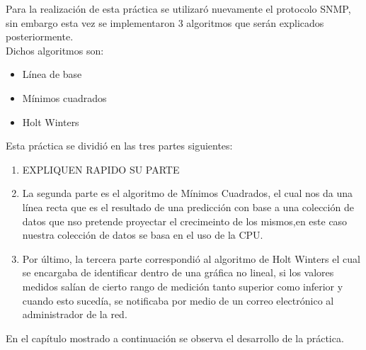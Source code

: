 Para la realización de esta práctica se utilizaró nuevamente el protocolo SNMP, sin embargo esta vez se implementaron 3 algoritmos que serán explicados posteriormente.\\
Dichos algoritmos son:
\begin{itemize}
\item Línea de base
\item Mínimos cuadrados
\item Holt Winters
\end{itemize} 

Esta práctica se dividió en las tres partes siguientes:
\begin{enumerate}
\item EXPLIQUEN RAPIDO SU PARTE
\item La segunda parte es el algoritmo de Mínimos Cuadrados, el cual nos da una línea recta que es el resultado de una predicción con base a una colección de datos que nso pretende proyectar el crecimeinto de los mismos,en este caso nuestra colección de datos se basa en el uso de la CPU.
\item Por último, la tercera parte correspondió al algoritmo de Holt Winters el cual se encargaba de identificar dentro de una gráfica no lineal, si los valores medidos salían de cierto rango de medición tanto superior como inferior y cuando esto sucedía, se notificaba por medio de un correo electrónico al administrador de la red.
\end{enumerate}

En el capítulo mostrado a continuación se observa el desarrollo de la práctica.



 